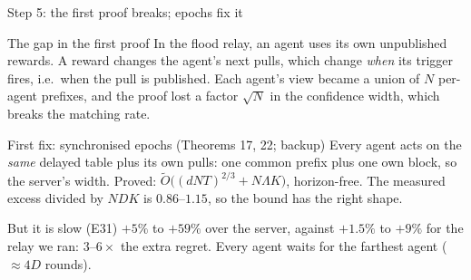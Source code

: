 \documentclass[11pt]{beamer}
\begin{document}
\begin{frame}{Step 5: the first proof breaks; epochs fix it}
\scriptsize
\begin{block}{The gap in the first proof}
In the flood relay, an agent uses its own unpublished rewards. A reward changes the agent's next pulls, which change \emph{when} its trigger fires, i.e.\ when the pull is published. Each agent's view became a union of $N$ per-agent prefixes, and the proof lost a factor $\sqrt N$ in the confidence width, which breaks the matching rate.
\end{block}
\begin{block}{First fix: synchronised epochs (Theorems 17, 22; backup)}
Every agent acts on the \emph{same} delayed table plus its own pulls: one common prefix plus one own block, so the server's width. Proved: $\tilde O\big((dNT)^{2/3}+N\Lambda K\big)$, horizon-free. The measured excess divided by $NDK$ is $0.86$--$1.15$, so the bound has the right shape.
\end{block}
\begin{alertblock}{But it is slow (E31)}
$+5\%$ to $+59\%$ over the server, against $+1.5\%$ to $+9\%$ for the relay we ran: $3$--$6\times$ the extra regret. Every agent waits for the farthest agent ($\approx4D$ rounds).
\end{alertblock}
\end{frame}
\end{document}
